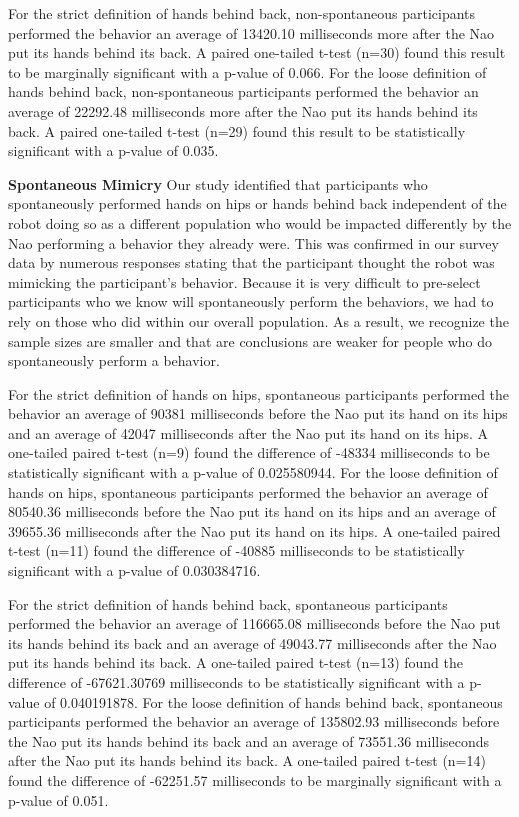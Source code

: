 \documentclass{acm_proc_article-sp}
\begin{document}
For the strict definition of hands behind back, non-spontaneous participants performed the behavior an average of 13420.10 milliseconds more after the Nao put its hands behind its back. A paired one-tailed t-test (n=30) found this result to be marginally significant with a p-value of 0.066. For the loose definition of hands behind back, non-spontaneous participants performed the behavior an average of 22292.48 milliseconds more after the Nao put its hands behind its back. A paired one-tailed t-test (n=29) found this result to be statistically significant with a p-value of 0.035.

\textbf{Spontaneous Mimicry} Our study identified that participants who spontaneously performed hands on hips or hands behind back independent of the robot doing so as a different population who would be impacted differently by the Nao performing a behavior they already were. This was confirmed in our survey data by numerous responses stating that the participant thought the robot was mimicking the participant's behavior. Because it is very difficult to pre-select participants who we know will spontaneously perform the behaviors, we had to rely on those who did within our overall population. As a result, we recognize the sample sizes are smaller and that are conclusions are weaker for people who do spontaneously perform a behavior.

For the strict definition of hands on hips, spontaneous participants performed the behavior an average of 90381 milliseconds before the Nao put its hand on its hips and an average of 42047 milliseconds after the Nao put its hand on its hips. A one-tailed paired t-test (n=9) found the difference of -48334 milliseconds to be statistically significant with a p-value of 0.025580944. For the loose definition of hands on hips, spontaneous participants performed the behavior an average of 80540.36 milliseconds before the Nao put its hand on its hips and an average of 39655.36 milliseconds after the Nao put its hand on its hips. A one-tailed paired t-test (n=11) found the difference of -40885 milliseconds to be statistically significant with a p-value of 0.030384716.

For the strict definition of hands behind back, spontaneous participants performed the behavior an average of 116665.08 milliseconds before the Nao put its hands behind its back and an average of 49043.77 milliseconds after the Nao put its hands behind its back. A one-tailed paired t-test (n=13) found the difference of -67621.30769 milliseconds to be statistically significant with a p-value of 0.040191878. For the loose definition of hands behind back, spontaneous participants performed the behavior an average of 135802.93 milliseconds before the Nao put its hands behind its back and an average of 73551.36 milliseconds after the Nao put its hands behind its back. A one-tailed paired t-test (n=14) found the difference of -62251.57 milliseconds to be marginally significant with a p-value of 0.051.
\end{document}
